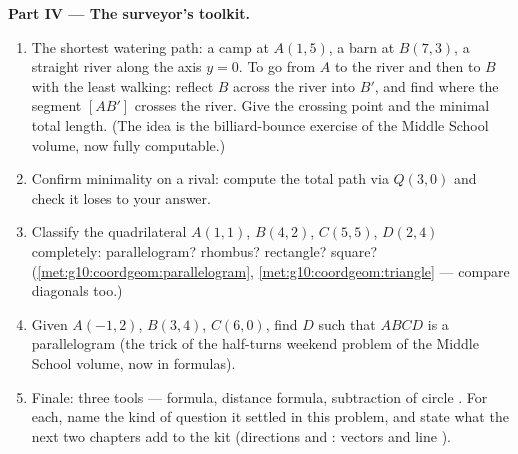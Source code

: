 \begin{problem}
\medskip
\noindent\textbf{Part IV --- The surveyor's toolkit.}
\begin{enumerate}[resume]
  \item The shortest watering path: a camp at $A(1, 5)$, a barn
        at $B(7, 3)$, a straight river along the axis $y = 0$.
        To go from $A$ to the river and then to $B$ with the
        least walking: reflect $B$ across the river into $B'$,
        and find where the segment $[AB']$ crosses the river.
        Give the crossing point and the minimal total length.
        (The idea is the billiard-bounce exercise of the Middle School volume, now fully
        computable.)
  \item Confirm minimality on a rival: compute the total path
        via $Q(3, 0)$ and check it loses to your answer.
  \item Classify the quadrilateral $A(1,1)$, $B(4,2)$,
        $C(5,5)$, $D(2,4)$ completely: parallelogram? rhombus?
        rectangle? square?
        (\cref{met:g10:coordgeom:parallelogram},
        \cref{met:g10:coordgeom:triangle} --- compare diagonals
        too.)
  \item Given $A(-1, 2)$, $B(3, 4)$, $C(6, 0)$, find $D$ such
        that $ABCD$ is a parallelogram (the 
        trick of the half-turns weekend problem of the Middle School volume, now in formulas).
  \item Finale: three tools ---  formula, distance
        formula, subtraction of circle . For each, name
        the kind of question it settled in this problem, and
        state what the next two chapters add to the kit
        (directions and : vectors and line ).
\end{enumerate}
\end{problem}
